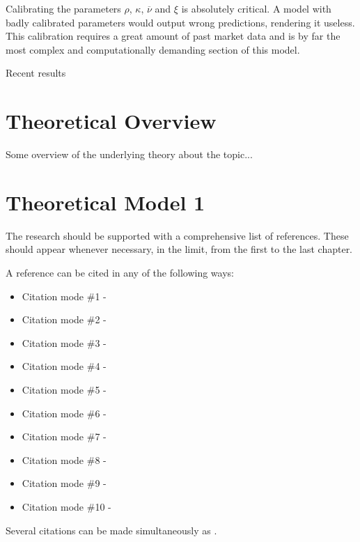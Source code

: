 Calibrating the parameters  $\rho$, $\kappa$, $\overline{\nu}$ and $\xi$ is absolutely critical. A model with badly calibrated parameters would output wrong predictions, rendering it useless.
This calibration requires a great amount of past market data and is by far the most complex and computationally demanding section of this model.

Recent results ~\cite{Cui}


\section{Theoretical Overview}
\label{section:overview}


Some overview of the underlying theory about the topic...


\section{Theoretical Model 1}
\label{section:theory1}

The research should be supported with a comprehensive list of references.
These should appear whenever necessary, in the limit, from the first to the last chapter.

A reference can be cited in any of the following ways:
%
\begin{itemize}
  \item Citation mode \#1 - \quad \cite{jameson:adjointns}
  \item Citation mode \#2 - \quad \citet{jameson:adjointns}
  \item Citation mode \#3 - \quad \citep{jameson:adjointns}
  \item Citation mode \#4 - \quad \citet*{jameson:adjointns}
  \item Citation mode \#5 - \quad \citep*{jameson:adjointns}
  \item Citation mode \#6 - \quad \citealt{jameson:adjointns}
  \item Citation mode \#7 - \quad \citealp{jameson:adjointns}
  \item Citation mode \#8 - \quad \citeauthor{jameson:adjointns}
  \item Citation mode \#9 - \quad \citeyear{jameson:adjointns}
  \item Citation mode \#10 - \quad \citeyearpar{jameson:adjointns}
\end{itemize}
%
Several citations can be made simultaneously as \citep{nocedal:opt,marta:ijcfd}. \\


